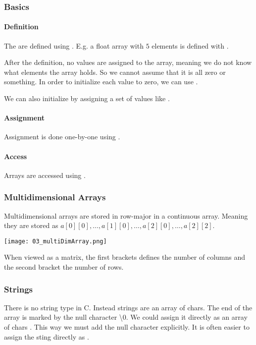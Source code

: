 \subsubsection{Basics}
\paragraph{Definition}
The are defined using . E.g. a float array with $5$ elements is defined with .

After the definition, no values are assigned to the array, meaning we do not know what elements the array holds. So we cannot assume that it is all zero or something. In order to initialize each value to zero, we can use .

We can also initialize by assigning a set of values like .

\paragraph{Assignment}
Assignment is done one-by-one using .

\paragraph{Access}
Arrays are accessed using .

\subsubsection{Multidimensional Arrays}
Multidimensional arrays are stored in row-major in a continuous array. Meaning they are stored as $a[0][0], \dots, a[1][0], \dots, a[2][0], \dots, a[2][2]$.

\texttt{[image: 03\_multiDimArray.png]}

When viewed as a matrix, the first brackets defines the number of columns and the second bracket the number of rows.

\subsubsection{Strings}
There is no string type in C. Instead strings are an array of chars. The end of the array is marked by the null character \textbackslash 0. We could assign it directly as an array of chars . This way we must add the null character explicitly. It is often easier to assign the sting directly as .

